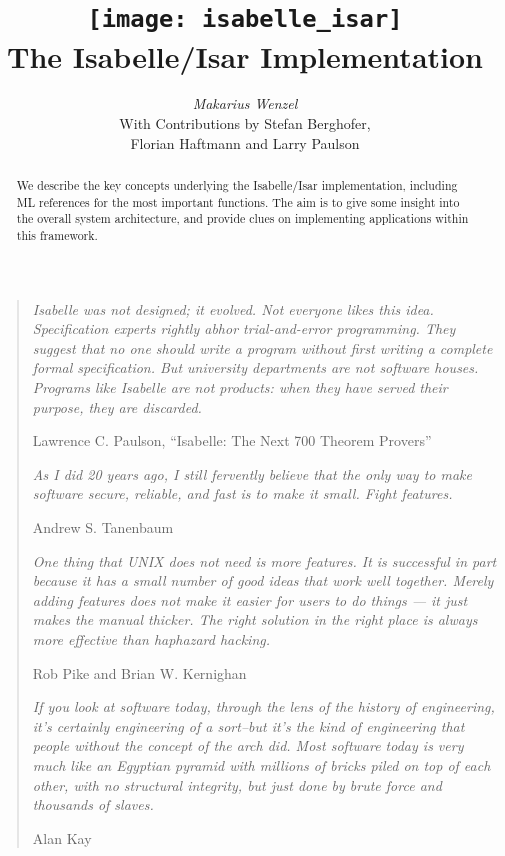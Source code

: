 \documentclass[12pt,a4paper,fleqn]{report}
\title{\texttt{[image: isabelle\_isar]}
  \\[4ex] The Isabelle/Isar Implementation}
\author{\emph{Makarius Wenzel}  \\[3ex]
  With Contributions by
  Stefan Berghofer, \\
  Florian Haftmann
  and Larry Paulson
}
\begin{document}
\maketitle

\begin{abstract}
  We describe the key concepts underlying the Isabelle/Isar
  implementation, including ML references for the most important
  functions.  The aim is to give some insight into the overall system
  architecture, and provide clues on implementing applications within
  this framework.
\end{abstract}

\vspace*{2.5cm}
\begin{quote}

  {\small\em Isabelle was not designed; it evolved.  Not everyone
    likes this idea.  Specification experts rightly abhor
    trial-and-error programming.  They suggest that no one should
    write a program without first writing a complete formal
    specification. But university departments are not software houses.
    Programs like Isabelle are not products: when they have served
    their purpose, they are discarded.}

  Lawrence C. Paulson, ``Isabelle: The Next 700 Theorem Provers''

  \vspace*{1cm}

  {\small\em As I did 20 years ago, I still fervently believe that the
    only way to make software secure, reliable, and fast is to make it
    small.  Fight features.}

  Andrew S. Tanenbaum

  \vspace*{1cm}

  {\small\em One thing that UNIX does not need is more features. It is
    successful in part because it has a small number of good ideas
    that work well together. Merely adding features does not make it
    easier for users to do things --- it just makes the manual
    thicker. The right solution in the right place is always more
    effective than haphazard hacking.}

  Rob Pike and Brian W. Kernighan

  \vspace*{1cm}

  {\small\em If you look at software today, through the lens of the
    history of engineering, it's certainly engineering of a sort--but
    it's the kind of engineering that people without the concept of
    the arch did. Most software today is very much like an Egyptian
    pyramid with millions of bricks piled on top of each other, with
    no structural integrity, but just done by brute force and
    thousands of slaves.}

  Alan Kay

\end{quote}
\end{document}
